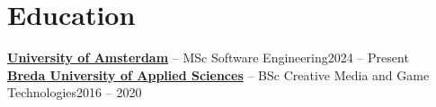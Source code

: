 \documentclass[11pt]{article}       %
\begin{document}
\vspace{-9pt}

\section*{Education}
\textbf{\href{https://www.uva.nl/shared-content/programmas/en/masters/software-engineering/software-engineering.html}{University of Amsterdam}} -- MSc Software Engineering\hfill 2024 -- Present \\
\textbf{\href{https://www.buas.nl/en/programmes/creative-media-and-game-technologies/programming}{Breda University of Applied Sciences}} -- BSc Creative Media and Game Technologies\hfill 2016 -- 2020
\end{document}
